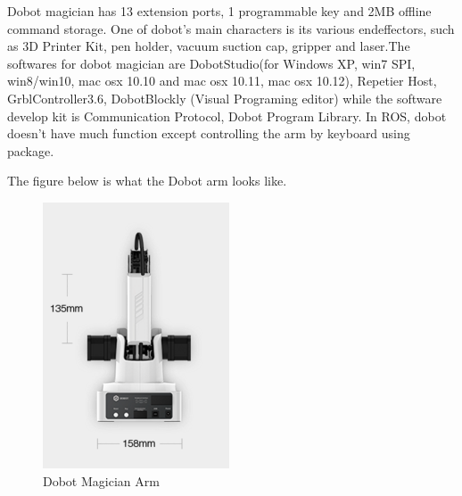 \documentclass[10pt,twocolumn,letterpaper]{article}
\begin{document}
Dobot magician has 13 extension ports, 1 programmable key and 2MB offline command storage. One of dobot’s main characters is its various endeffectors, such as 3D Printer Kit, pen holder, vacuum suction cap, gripper and laser.The softwares for dobot magician are DobotStudio(for Windows XP, win7 SPI, win8/win10, mac osx 10.10 and mac osx 10.11, mac osx 10.12), Repetier Host, GrblController3.6, DobotBlockly (Visual Programing editor) while the software develop kit is Communication Protocol, Dobot Program Library. In ROS, dobot doesn’t have much function except controlling the arm by keyboard using package.

The figure below is what the Dobot arm looks like.

\begin{figure}[t]
\begin{center}
	\includegraphics[width=0.8\linewidth]{dobot1.png}
\end{center}
   \caption{Dobot Magician Arm}
\label{fig:long}
\label{fig:onecol}
\end{figure}
\end{document}
